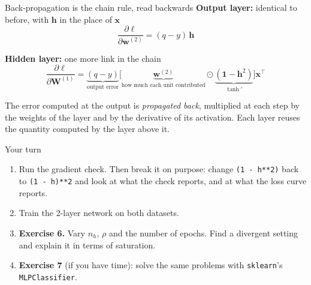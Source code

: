 \documentclass[aspectratio=169,10pt]{beamer}
\newcommand{\vx}{{\bm x}}
\newcommand{\vw}{{\bm w}}
\newcommand{\vW}{{\bm W}}
\newcommand{\vh}{{\bm h}}
\newcommand{\vo}{{\bm o}}
\begin{document}
\begin{frame}{Back-propagation is the chain rule, read backwards}
\textbf{Output layer:} identical to before, with $\vh$ in the place of $\vx$
$$\frac{\partial \ell}{\partial \vw^{(2)}} = (q-y)\,\vh$$

\textbf{Hidden layer:} one more link in the chain
$$\frac{\partial \ell}{\partial \vW^{(1)}}
 = \underbrace{(q - y)}_{\text{output error}}
   \big[\underbrace{\vw^{(2)}}_{\text{how much each unit contributed}}
   \odot \underbrace{(\bm 1 - \vh^2)}_{\tanh'}\big]\vx^\intercal$$

\begin{keybox}
The error computed at the output is \emph{propagated back}, multiplied at each step by the
weights of the layer and by the derivative of its activation. Each layer reuses the
quantity computed by the layer above it.
\end{keybox}
\end{frame}

\begin{frame}{Your turn}
\begin{practice}
\begin{enumerate}
  \item Run the gradient check. Then break it on purpose: change \texttt{(1 - h**2)}
        back to \texttt{(1 - h)**2} and look at what the check reports, and at what the
        loss curve reports.
  \item Train the 2-layer network on both datasets.
  \item \textbf{Exercise 6.} Vary $n_h$, $\rho$ and the number of epochs. Find a divergent
        setting and explain it in terms of saturation.
  \item \textbf{Exercise 7} (if you have time): solve the same problems with
        \texttt{sklearn}'s \texttt{MLPClassifier}.
\end{enumerate}
\end{practice}
\end{frame}
\end{document}
